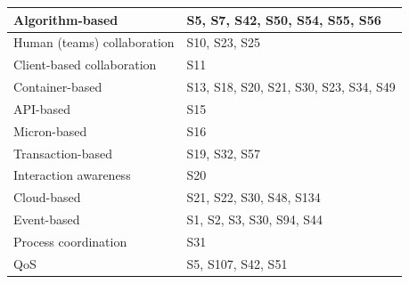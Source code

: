 \documentclass{article}
\begin{document}
\begin{multicols}{2}
\begin{table}[ht!]
\begin{center}
\begin{tabular}{ | m{20em} | m{20em} | }
Algorithm-based                                                   & S5,   S7, S42, S50, S54, S55, S56                                                                       \\ \hline
Human   (teams) collaboration                                     & S10,   S23, S25                                                                                         \\ \hline
Client-based   collaboration                                      & S11                                                                                                     \\ \hline
Container-based                                                   & S13,   S18, S20, S21, S30, S23, S34, S49                                                                \\ \hline
API-based                                                         & S15                                                                                                     \\ \hline
Micron-based                                                      & S16                                                                                                     \\ \hline
Transaction-based                                                 & S19,   S32, S57                                                                                         \\ \hline
Interaction   awareness                                           & S20                                                                                                     \\ \hline
Cloud-based                                                       & S21,   S22, S30, S48, S134                                                                              \\ \hline
Event-based                                                       & S1,   S2, S3, S30, S94, S44                                                                             \\ \hline
Process   coordination                                            & S31                                                                                                     \\ \hline
QoS                                                               & S5,   S107, S42, S51                                                                                    \\ \hline

\end{tabular}
\end{center}
\end{table}
\end{multicols}
\end{document}
